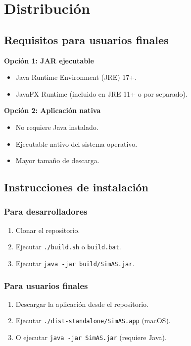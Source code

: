 \section{Distribución}

\subsection{Requisitos para usuarios finales}

\textbf{Opción 1: JAR ejecutable}
\begin{itemize}
    \item Java Runtime Environment (JRE) 17+.
    \item JavaFX Runtime (incluido en JRE 11+ o por separado).
\end{itemize}

\textbf{Opción 2: Aplicación nativa}
\begin{itemize}
    \item No requiere Java instalado.
    \item Ejecutable nativo del sistema operativo.
    \item Mayor tamaño de descarga.
\end{itemize}

\subsection{Instrucciones de instalación}

\subsubsection{Para desarrolladores}
\begin{enumerate}
    \item Clonar el repositorio.
    \item Ejecutar \texttt{./build.sh} o \texttt{build.bat}.
    \item Ejecutar \texttt{java -jar build/SimAS.jar}.
\end{enumerate}

\subsubsection{Para usuarios finales}
\begin{enumerate}
    \item Descargar la aplicación desde el repositorio.
    \item Ejecutar \texttt{./dist-standalone/SimAS.app} (macOS).
    \item O ejecutar \texttt{java -jar SimAS.jar} (requiere Java).
\end{enumerate}


